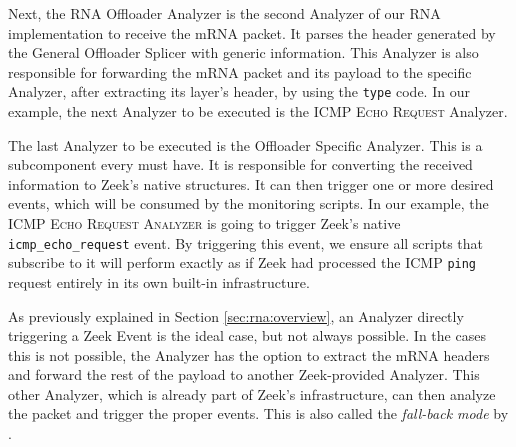 
Next, the RNA Offloader Analyzer is the second Analyzer of our RNA implementation to receive the mRNA packet. It parses the header generated by the General Offloader Splicer with \Offloader{} generic information. This Analyzer is also responsible for forwarding the mRNA packet and its payload to the \Offloader{} specific Analyzer, after extracting its layer's header, by using the \Offloader{} \texttt{type} code. In our example, the next Analyzer to be executed is the \textsc{ICMP Echo Request} Analyzer.

The last Analyzer to be executed is the Offloader Specific Analyzer. This is a subcomponent every \Offloader{} must have. It is responsible for converting the received information to Zeek's native structures. It can then trigger one or more desired events, which will be consumed by the monitoring scripts. In our example, the \textsc{ICMP Echo Request Analyzer} is going to trigger Zeek's native \texttt{icmp\_echo\_request} event. By triggering this event, we ensure all scripts that subscribe to it will perform exactly as if Zeek had processed the ICMP \texttt{ping} request entirely in its own built-in infrastructure.

As previously explained in Section \ref{sec:rna:overview}, an Analyzer directly triggering a Zeek Event is the ideal case, but not always possible. In the cases this is not possible, the Analyzer has the option to extract the mRNA headers and forward the rest of the payload to another Zeek-provided Analyzer. This other Analyzer, which is already part of Zeek's infrastructure, can then analyze the packet and trigger the proper events. This is also called the \textit{fall-back mode} by .
